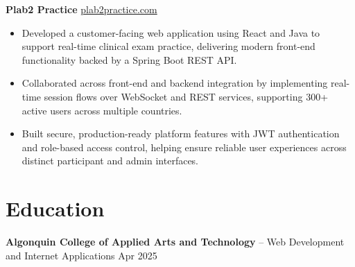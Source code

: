 \documentclass[11pt]{article}       %
\begin{document}
\textbf{Plab2 Practice} \hfill \href{https://plab2practice.com}{plab2practice.com} \\
\vspace{-9pt}
\begin{itemize}
  \item Developed a customer-facing web application using React and Java to support real-time clinical exam practice, delivering modern front-end functionality backed by a Spring Boot REST API.
  \item Collaborated across front-end and backend integration by implementing real-time session flows over WebSocket and REST services, supporting 300+ active users across multiple countries.
  \item Built secure, production-ready platform features with JWT authentication and role-based access control, helping ensure reliable user experiences across distinct participant and admin interfaces.
\end{itemize}





\section*{Education}
\textbf{Algonquin College of Applied Arts and Technology} -- Web Development and Internet Applications
\hfill Apr 2025 \\
\end{document}
